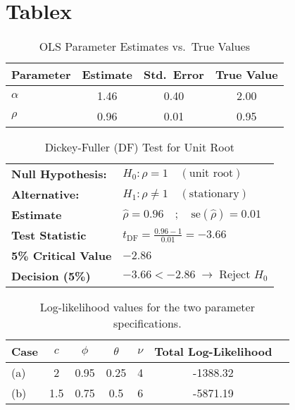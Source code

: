 \documentclass[a4paper,12pt]{article}
\begin{document}
\section{Tablex}
\begin{table}[ht]
    \centering
    \caption{OLS Parameter Estimates vs.\ True Values}
    \label{tab:ols-results}
    \begin{tabular}{lccc}
        \hline
        \textbf{Parameter} & \textbf{Estimate} & \textbf{Std.\ Error} & \textbf{True Value} \\
        \hline
        $\alpha$ & 1.46 & 0.40 & 2.00 \\
        $\rho$   & 0.96 & 0.01 & 0.95 \\
        \hline
    \end{tabular}
\end{table}

\begin{table}[ht!]
\centering
\caption{Dickey-Fuller (DF) Test for Unit Root}
\label{tab:DF-test}

\begin{tabular}{l l}
\toprule
\textbf{Null Hypothesis:}   & $H_0: \rho = 1 \quad (\text{unit root})$ \\
\textbf{Alternative:}       & $H_1: \rho \neq 1 \quad (\text{stationary})$ \\
\midrule
\textbf{Estimate}           & $\hat{\rho} = 0.96 \quad;\quad \mathrm{se}(\hat{\rho}) = 0.01$ \\
\textbf{Test Statistic}     & $t_{\mathrm{DF}} = \frac{0.96 - 1}{0.01} = -3.66$ \\
\textbf{5\% Critical Value} & $-2.86$ \\
\textbf{Decision (5\%)}     & $-3.66 < -2.86 \;\rightarrow\; \text{Reject } H_0$ \\
\bottomrule
\end{tabular}
\end{table}



\begin{table}[h!]
\centering
\begin{tabular}{@{}lcccccc@{}}
\toprule
Case & $c$ & $\phi$ & $\theta$ & $\nu$ & Total Log-Likelihood \\ \midrule
(a)  & 2   & 0.95   & 0.25     & 4     & -1388.32             \\
(b)  & 1.5 & 0.75   & 0.5      & 6     & -5871.19             \\ \bottomrule
\end{tabular}
\caption{Log-likelihood values for the two parameter specifications.}
\label{tab:results} %
\end{table}
\end{document}
